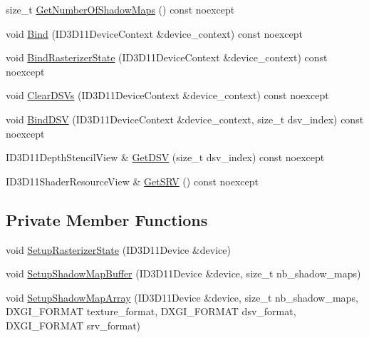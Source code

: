 \begin{DoxyCompactItemize}
\item 
size\+\_\+t \mbox{\hyperlink{classmage_1_1rendering_1_1_shadow_map_buffer_ac0fe3de2d5a4bf147ac2aad969a234aa}{Get\+Number\+Of\+Shadow\+Maps}} () const noexcept
\item 
void \mbox{\hyperlink{classmage_1_1rendering_1_1_shadow_map_buffer_a59fccb2b8261a60c955f81e16d530cda}{Bind}} (I\+D3\+D11\+Device\+Context \&device\+\_\+context) const noexcept
\item 
void \mbox{\hyperlink{classmage_1_1rendering_1_1_shadow_map_buffer_a5216f8d02a3e92a8dcd34dcc6889563c}{Bind\+Rasterizer\+State}} (I\+D3\+D11\+Device\+Context \&device\+\_\+context) const noexcept
\item 
void \mbox{\hyperlink{classmage_1_1rendering_1_1_shadow_map_buffer_a1af9b2bbeaefb1367dbf6c66a2191bcc}{Clear\+D\+S\+Vs}} (I\+D3\+D11\+Device\+Context \&device\+\_\+context) const noexcept
\item 
void \mbox{\hyperlink{classmage_1_1rendering_1_1_shadow_map_buffer_a8aec694d4bc459fefbecb0845c962148}{Bind\+D\+SV}} (I\+D3\+D11\+Device\+Context \&device\+\_\+context, size\+\_\+t dsv\+\_\+index) const noexcept
\item 
I\+D3\+D11\+Depth\+Stencil\+View \& \mbox{\hyperlink{classmage_1_1rendering_1_1_shadow_map_buffer_a379cf376faebf4a665e11fee91c8fae6}{Get\+D\+SV}} (size\+\_\+t dsv\+\_\+index) const noexcept
\item 
I\+D3\+D11\+Shader\+Resource\+View \& \mbox{\hyperlink{classmage_1_1rendering_1_1_shadow_map_buffer_adeb2ed077758818da87fd83dc26660e1}{Get\+S\+RV}} () const noexcept
\end{DoxyCompactItemize}
\subsection*{Private Member Functions}
\begin{DoxyCompactItemize}
\item 
void \mbox{\hyperlink{classmage_1_1rendering_1_1_shadow_map_buffer_a04622e03086e5a16783bad043b8754a8}{Setup\+Rasterizer\+State}} (I\+D3\+D11\+Device \&device)
\item 
void \mbox{\hyperlink{classmage_1_1rendering_1_1_shadow_map_buffer_a282239c7ff9ba50246126861d843cf6c}{Setup\+Shadow\+Map\+Buffer}} (I\+D3\+D11\+Device \&device, size\+\_\+t nb\+\_\+shadow\+\_\+maps)
\item 
void \mbox{\hyperlink{classmage_1_1rendering_1_1_shadow_map_buffer_a3efe8318385c4807b1982873afa0e77b}{Setup\+Shadow\+Map\+Array}} (I\+D3\+D11\+Device \&device, size\+\_\+t nb\+\_\+shadow\+\_\+maps, D\+X\+G\+I\+\_\+\+F\+O\+R\+M\+AT texture\+\_\+format, D\+X\+G\+I\+\_\+\+F\+O\+R\+M\+AT dsv\+\_\+format, D\+X\+G\+I\+\_\+\+F\+O\+R\+M\+AT srv\+\_\+format)
\end{DoxyCompactItemize}
